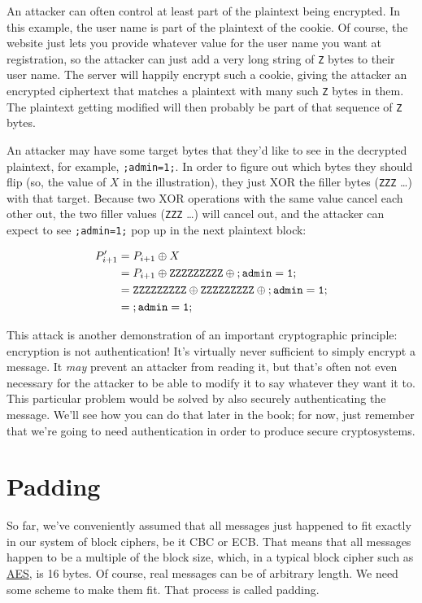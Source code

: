 \documentclass[11pt,ebook,table,dvipsnames]{memoir}
\begin{document}
An attacker can often control at least part of the plaintext being
encrypted. In this example, the user name is part of the plaintext of
the cookie. Of course, the website just lets you provide whatever
value for the user name you want at registration, so the attacker can
just add a very long string of \verb~Z~ bytes to their user name. The
server will happily encrypt such a cookie, giving the attacker an
encrypted ciphertext that matches a plaintext with many such \verb~Z~ bytes in
them. The plaintext getting modified will then probably be part of
that sequence of \verb~Z~ bytes.

An attacker may have some target bytes that they'd like to see in the
decrypted plaintext, for example, \verb*|;admin=1;|. In order to
figure out which bytes they should flip (so, the value of $X$ in the
illustration), they just XOR the filler bytes (\verb~ZZZ~ \ldots) with that
target. Because two XOR operations with the same value cancel each
other out, the two filler values (\verb~ZZZ~ \ldots) will cancel out, and
the attacker can expect to see \verb|;admin=1;| pop up in the next
plaintext block:

\begin{align*}
P^{\prime}_{i + 1}
& = P_{i + 1} \oplus X \\
& = P_{i + 1}
  \oplus \mathtt{ZZZZZZZZZ}
  \oplus \mathtt{;admin=1;} \\
& = \mathtt{ZZZZZZZZZ}
  \oplus \mathtt{ZZZZZZZZZ}
  \oplus \mathtt{;admin=1;} \\
& = \mathtt{;admin=1;} \\
\end{align*}

This attack is another demonstration of an important cryptographic
principle: encryption is not authentication! It's virtually never
sufficient to simply encrypt a message. It \emph{may} prevent an attacker
from reading it, but that's often not even necessary for the attacker
to be able to modify it to say whatever they want it to. This
particular problem would be solved by also securely authenticating the
message. We'll see how you can do that later in the book; for now,
just remember that we're going to need authentication in order to
produce secure cryptosystems.
\section{Padding}
\label{sec-2-3-8}

So far, we've conveniently assumed that all messages just happened to
fit exactly in our system of block ciphers, be it CBC or ECB. That
means that all messages happen to be a multiple of the block size,
which, in a typical block cipher such as \hyperref[AES]{AES}, is 16 bytes. Of course,
real messages can be of arbitrary length. We need some scheme to make
them fit. That process is called padding.
\end{document}
